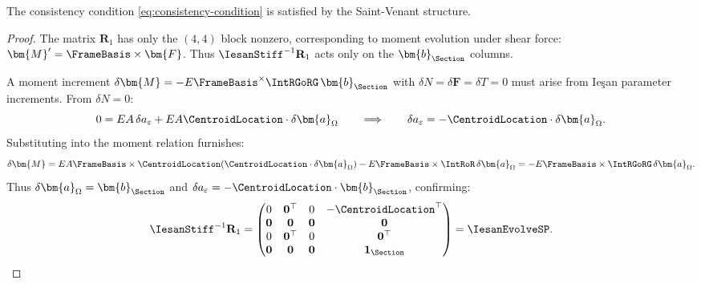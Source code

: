 \begin{Details}
\begin{proposition}
The consistency condition \eqref{eq:consistency-condition} is satisfied by 
the Saint-Venant structure.
\end{proposition}

\begin{proof}
The matrix $\mathbf{R}_1$ has only the $(4,4)$ block nonzero, corresponding 
to moment evolution under shear force: $\bm{M}' = \FrameBasis \times \bm{F}$.
Thus $\IesanStiff^{-1}\mathbf{R}_1$ acts only on the $\bm{b}_{\Section}$ columns.

A moment increment $\delta\bm{M} = -E\FrameBasis^\times\IntRGoRG\,\bm{b}_{\Section}$ 
with $\delta N = \delta\bm{F} = \delta T = 0$ must arise from Ieşan parameter 
increments. 
From $\delta N = 0$:
\begin{equation*}
0 = EA\,\delta a_\varepsilon + EA\CentroidLocation \cdot \delta\bm{a}_\Omega
\qquad \Longrightarrow \qquad
\delta a_\varepsilon = -\CentroidLocation \cdot \delta\bm{a}_\Omega.
\end{equation*}
Substituting into the moment relation furnishes:
\begin{equation*}
\delta\bm{M} = EA\FrameBasis\times\CentroidLocation(\CentroidLocation \cdot \delta\bm{a}_\Omega) 
- E\FrameBasis\times\IntRoR\,\delta\bm{a}_\Omega
= -E\FrameBasis\times\IntRGoRG\,\delta\bm{a}_\Omega.
\end{equation*}
Thus $\delta\bm{a}_\Omega = \bm{b}_{\Section}$ and 
$\delta a_\varepsilon = -\CentroidLocation \cdot \bm{b}_{\Section}$, confirming:
\begin{equation*}
\IesanStiff^{-1}\mathbf{R}_1 = \begin{pmatrix}
0 & \mathbf{0}^\top & 0 & -\CentroidLocation^\top \\
\mathbf{0} & \mathbf{0} & \mathbf{0} & \mathbf{0} \\
0 & \mathbf{0}^\top & 0 & \mathbf{0}^\top \\
\mathbf{0} & \mathbf{0} & \mathbf{0} & \mathbf{1}_\Section
\end{pmatrix} = \IesanEvolveSP. \qedhere
\end{equation*}
\end{proof}
\end{Details}

% 
% 
% 
